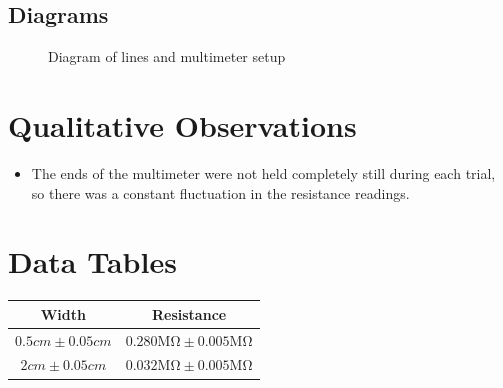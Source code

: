 \documentclass[12pt]{article}
\begin{document}
\subsection{Diagrams}

\begin{figure}[H]
    \centering
    \caption{Diagram of lines and multimeter setup}
    \label{fig:diagram}
\end{figure}

\section{Qualitative Observations}

\begin{itemize}
    \item The ends of the multimeter were not held completely still during each trial, so there was a constant fluctuation in the resistance readings.
\end{itemize}

\newpage

\section{Data Tables}

\begin{center}
    \begin{tabular}{|c|c|}
        \hline
        \textbf{Width} & \textbf{Resistance} \\
        \hline \hline
        $0.5\si{cm} \pm 0.05\si{cm}$ & $0.280\si{\mega\ohm} \pm 0.005\si{\mega\ohm}$ \\
        \hline
        $2\si{cm} \pm 0.05\si{cm}$ & $0.032\si{\mega\ohm} \pm 0.005\si{\mega\ohm}$ \\
        \hline
    \end{tabular}
\end{center}
\end{document}
